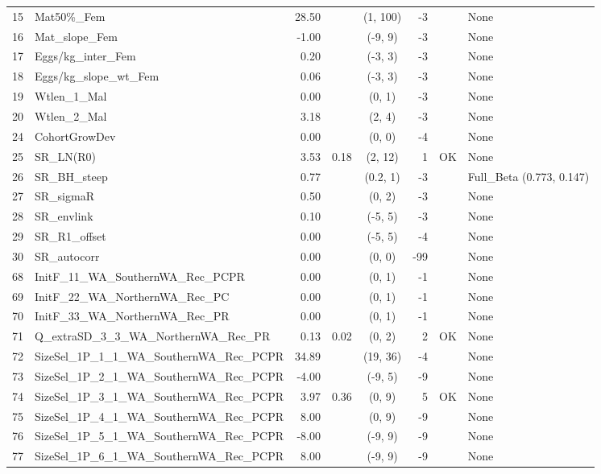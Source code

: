 \documentclass[12pt,]{article}
\begin{document}
\begin{landscape}
\begin{longtable}{rlrrcrcl}
  15 & Mat50\%\_Fem & 28.50 &  & (1, 100) & -3 &  & None \\ 
  16 & Mat\_slope\_Fem & -1.00 &  & (-9, 9) & -3 &  & None \\ 
  17 & Eggs/kg\_inter\_Fem & 0.20 &  & (-3, 3) & -3 &  & None \\ 
  18 & Eggs/kg\_slope\_wt\_Fem & 0.06 &  & (-3, 3) & -3 &  & None \\ 
  19 & Wtlen\_1\_Mal & 0.00 &  & (0, 1) & -3 &  & None \\ 
  20 & Wtlen\_2\_Mal & 3.18 &  & (2, 4) & -3 &  & None \\ 
  24 & CohortGrowDev & 0.00 &  & (0, 0) & -4 &  & None \\ 
  25 & SR\_LN(R0) & 3.53 & 0.18 & (2, 12) & 1 & OK & None \\ 
  26 & SR\_BH\_steep & 0.77 &  & (0.2, 1) & -3 &  & Full\_Beta (0.773, 0.147) \\ 
  27 & SR\_sigmaR & 0.50 &  & (0, 2) & -3 &  & None \\ 
  28 & SR\_envlink & 0.10 &  & (-5, 5) & -3 &  & None \\ 
  29 & SR\_R1\_offset & 0.00 &  & (-5, 5) & -4 &  & None \\ 
  30 & SR\_autocorr & 0.00 &  & (0, 0) & -99 &  & None \\ 
  68 & InitF\_11\_WA\_SouthernWA\_Rec\_PCPR & 0.00 &  & (0, 1) & -1 &  & None \\ 
  69 & InitF\_22\_WA\_NorthernWA\_Rec\_PC & 0.00 &  & (0, 1) & -1 &  & None \\ 
  70 & InitF\_33\_WA\_NorthernWA\_Rec\_PR & 0.00 &  & (0, 1) & -1 &  & None \\ 
  71 & Q\_extraSD\_3\_3\_WA\_NorthernWA\_Rec\_PR & 0.13 & 0.02 & (0, 2) & 2 & OK & None \\ 
  72 & SizeSel\_1P\_1\_1\_WA\_SouthernWA\_Rec\_PCPR & 34.89 &  & (19, 36) & -4 &  & None \\ 
  73 & SizeSel\_1P\_2\_1\_WA\_SouthernWA\_Rec\_PCPR & -4.00 &  & (-9, 5) & -9 &  & None \\ 
  74 & SizeSel\_1P\_3\_1\_WA\_SouthernWA\_Rec\_PCPR & 3.97 & 0.36 & (0, 9) & 5 & OK & None \\ 
  75 & SizeSel\_1P\_4\_1\_WA\_SouthernWA\_Rec\_PCPR & 8.00 &  & (0, 9) & -9 &  & None \\ 
  76 & SizeSel\_1P\_5\_1\_WA\_SouthernWA\_Rec\_PCPR & -8.00 &  & (-9, 9) & -9 &  & None \\ 
  77 & SizeSel\_1P\_6\_1\_WA\_SouthernWA\_Rec\_PCPR & 8.00 &  & (-9, 9) & -9 &  & None \\ 

\end{longtable}
\end{landscape}
\end{document}
